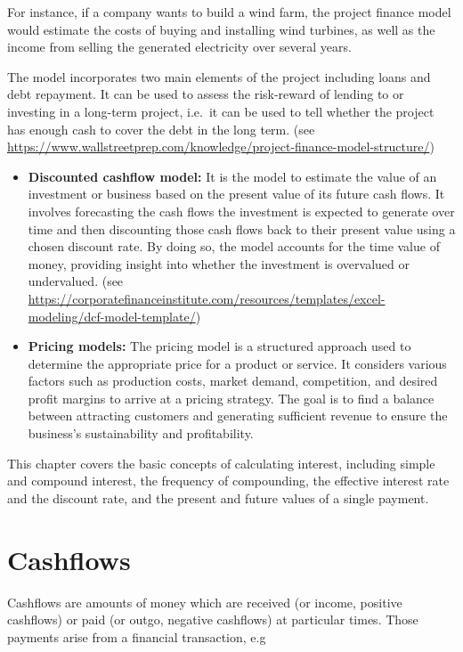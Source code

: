 \documentclass[
]{book}
\theoremstyle{definition}
\theoremstyle{definition}
\theoremstyle{definition}
\theoremstyle{definition}
\theoremstyle{remark}
\begin{document}
For instance, if a company wants to build a wind farm, the project finance model would estimate the costs of buying and installing wind turbines, as well as the income from selling the generated electricity over several years.

The model incorporates two main elements
of the project including loans and debt repayment. It can be used to
assess the risk-reward of lending to or investing in a long-term
project, i.e.~it can be used to tell whether the project has enough
cash to cover the debt in the long term. (see
\url{https://www.wallstreetprep.com/knowledge/project-finance-model-structure/})

\begin{itemize}
\item
  \textbf{Discounted cashflow model:} It is the model to
  estimate the value of an investment or business based on the present value of its future cash flows. It involves forecasting the cash flows the investment is expected to generate over time and then discounting those cash flows back to their present value using a chosen discount rate. By doing so, the model accounts for the time value of money, providing insight into whether the investment is overvalued or undervalued.
  (see
  \url{https://corporatefinanceinstitute.com/resources/templates/excel-modeling/dcf-model-template/})
\item
  \textbf{Pricing models:} The pricing model is a structured approach used to determine the appropriate price for a product or service. It considers various factors such as production costs, market demand, competition, and desired profit margins to arrive at a pricing strategy. The goal is to find a balance between attracting customers and generating sufficient revenue to ensure the business's sustainability and profitability.
\end{itemize}

This chapter covers the basic concepts of calculating interest,
including simple and compound interest, the frequency of compounding,
the effective interest rate and the discount rate, and the present and
future values of a single payment.

\hypertarget{cashflows}{%
\section{Cashflows}\label{cashflows}}

Cashflows are amounts of money which are received (or income, positive
cashflows) or paid (or outgo, negative cashflows) at particular times.
Those payments arise from a financial transaction, e.g
\end{document}
